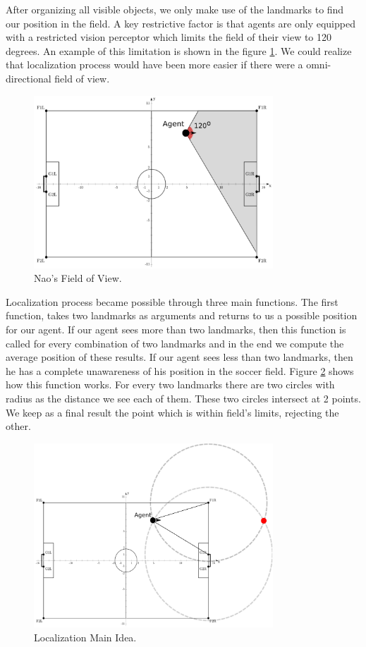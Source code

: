 After organizing all visible objects, we only make use of the landmarks to find our position in the field. A key restrictive factor is that 
agents are only equipped with a restricted vision perceptor which limits the field of their view to 120 degrees. An example of this limitation is shown in the figure \ref{fig:fieldofview}. We could realize that localization process would have been more easier if there were a omni-directional field of view.
\begin{figure}[htb!]
\centering
  \includegraphics[width=0.8\textwidth]{Chapter3/figures/LViewAngle.pdf}
  \caption{Nao's Field of View.} 
  \label{fig:fieldofview}
\end{figure}
 
Localization process became possible through three main functions. The first function, takes two landmarks as arguments and returns to us a possible position for our agent. If our agent sees more than two landmarks, then this function is called for every combination of two landmarks and in the end we compute the average position of these results. If our agent sees less than two landmarks, then he has a complete unawareness of his position in the soccer field. Figure \ref{fig:Localization} shows how this function works. For every two landmarks there are two circles with radius as the distance we see each of them. These two circles intersect at 2 points. We keep as a final result the point which is within field's limits, rejecting the other.
\begin{figure}[htb!]
\centering
  \includegraphics[width=0.8\textwidth]{Chapter3/figures/Localization.pdf}
  \caption{Localization Main Idea.} 
  \label{fig:Localization}
\end{figure}

